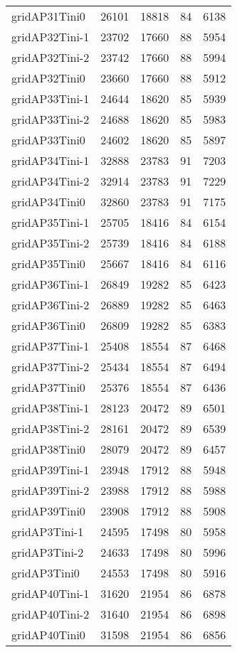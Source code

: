 \begin{longtable}{lrrrr}
gridAP31Tini0 & 26101 & 18818 & 84 & 6138 \\
gridAP32Tini-1 & 23702 & 17660 & 88 & 5954 \\
gridAP32Tini-2 & 23742 & 17660 & 88 & 5994 \\
gridAP32Tini0 & 23660 & 17660 & 88 & 5912 \\
gridAP33Tini-1 & 24644 & 18620 & 85 & 5939 \\
gridAP33Tini-2 & 24688 & 18620 & 85 & 5983 \\
gridAP33Tini0 & 24602 & 18620 & 85 & 5897 \\
gridAP34Tini-1 & 32888 & 23783 & 91 & 7203 \\
gridAP34Tini-2 & 32914 & 23783 & 91 & 7229 \\
gridAP34Tini0 & 32860 & 23783 & 91 & 7175 \\
gridAP35Tini-1 & 25705 & 18416 & 84 & 6154 \\
gridAP35Tini-2 & 25739 & 18416 & 84 & 6188 \\
gridAP35Tini0 & 25667 & 18416 & 84 & 6116 \\
gridAP36Tini-1 & 26849 & 19282 & 85 & 6423 \\
gridAP36Tini-2 & 26889 & 19282 & 85 & 6463 \\
gridAP36Tini0 & 26809 & 19282 & 85 & 6383 \\
gridAP37Tini-1 & 25408 & 18554 & 87 & 6468 \\
gridAP37Tini-2 & 25434 & 18554 & 87 & 6494 \\
gridAP37Tini0 & 25376 & 18554 & 87 & 6436 \\
gridAP38Tini-1 & 28123 & 20472 & 89 & 6501 \\
gridAP38Tini-2 & 28161 & 20472 & 89 & 6539 \\
gridAP38Tini0 & 28079 & 20472 & 89 & 6457 \\
gridAP39Tini-1 & 23948 & 17912 & 88 & 5948 \\
gridAP39Tini-2 & 23988 & 17912 & 88 & 5988 \\
gridAP39Tini0 & 23908 & 17912 & 88 & 5908 \\
gridAP3Tini-1 & 24595 & 17498 & 80 & 5958 \\
gridAP3Tini-2 & 24633 & 17498 & 80 & 5996 \\
gridAP3Tini0 & 24553 & 17498 & 80 & 5916 \\
gridAP40Tini-1 & 31620 & 21954 & 86 & 6878 \\
gridAP40Tini-2 & 31640 & 21954 & 86 & 6898 \\
gridAP40Tini0 & 31598 & 21954 & 86 & 6856 \\

\end{longtable}
